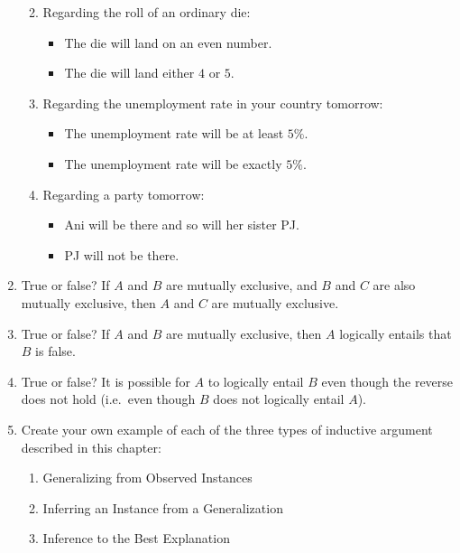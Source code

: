 \documentclass[justified]{tufte-book}
\providecommand{\tightlist}{%
  \setlength{\itemsep}{0pt}\setlength{\parskip}{0pt}}
\begin{document}
\begin{enumerate}
  \begin{enumerate}
  \def\labelenumii{\alph{enumii}.}
  \item
    Regarding the roll of an ordinary die:

    \begin{itemize}
    \tightlist
    \item
      The die will land on an even number.
    \item
      The die will land either \(4\) or \(5\).
    \end{itemize}
  \item
    Regarding the unemployment rate in your country tomorrow:

    \begin{itemize}
    \tightlist
    \item
      The unemployment rate will be at least \(5\%\).
    \item
      The unemployment rate will be exactly \(5\%\).
    \end{itemize}
  \item
    Regarding a party tomorrow:

    \begin{itemize}
    \tightlist
    \item
      Ani will be there and so will her sister PJ.
    \item
      PJ will not be there.
    \end{itemize}
  \end{enumerate}
\item
  True or false? If \(A\) and \(B\) are mutually exclusive, and \(B\) and \(C\) are also mutually exclusive, then \(A\) and \(C\) are mutually exclusive.
\item
  True or false? If \(A\) and \(B\) are mutually exclusive, then \(A\) logically entails that \(B\) is false.
\item
  True or false? It is possible for \(A\) to logically entail \(B\) even though the reverse does not hold (i.e.~even though \(B\) does not logically entail \(A\)).
\item
  Create your own example of each of the three types of inductive argument described in this chapter:

  \begin{enumerate}
  \def\labelenumii{\alph{enumii}.}
  \tightlist
  \item
    Generalizing from Observed Instances
  \item
    Inferring an Instance from a Generalization
  \item
    Inference to the Best Explanation
  \end{enumerate}
\end{enumerate}
\end{document}
